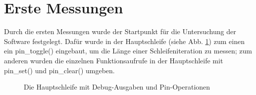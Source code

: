 \section{Erste Messungen}
Durch die ersten Messungen wurde der Startpunkt für die Untersuchung der Software
festgelegt. Dafür wurde in der Hauptschleife (siehe Abb. \ref{main_loop_full}) zum einen
ein pin\_toggle() eingebaut, um die Länge einer Schleifeniteration zu messen; zum anderen
wurden die einzelnen Funktionsaufrufe in der Hauptschleife mit pin\_set() und pin\_clear()
umgeben.
%
\begin{figure}[htb]
 \centering
 \caption{\label{main_loop_full}Die Hauptschleife mit Debug-Ausgaben und Pin-Operationen}
\end{figure}
